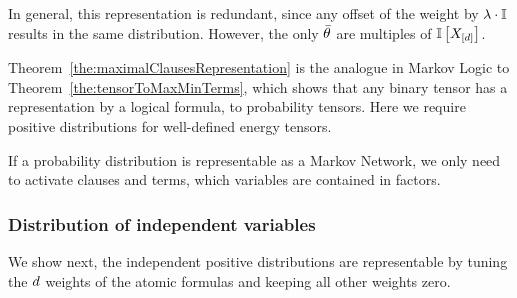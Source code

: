 In general, this representation is redundant, since any offset of the weight by $\lambda\cdot\mathbb{I}$ results in the same distribution.
However, the only $\bar{\theta}$ are multiples of $\mathbb{I}\left[X_{[d]}\right]$.

Theorem~\ref{the:maximalClausesRepresentation} is the analogue in Markov Logic to Theorem~\ref{the:tensorToMaxMinTerms}, which shows that any binary tensor has a representation by a logical formula, to probability tensors.
Here we require positive distributions for well-defined energy tensors.


\begin{remark}
	If a probability distribution is representable as a Markov Network, we only need to activate clauses and terms, which variables are contained in factors.
\end{remark}





\subsubsection{Distribution of independent variables}

We show next, the independent positive distributions are representable by tuning the $d$ weights of the atomic formulas and keeping all other weights zero.

